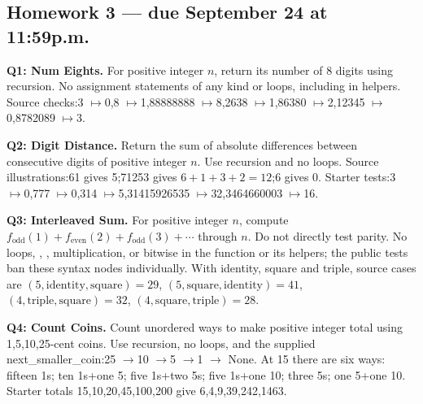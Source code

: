 \subsection{Homework 3 --- due September 24 at 11:59p.m.}
\begin{prob}
\textbf{Q1: Num Eights.} For positive integer $n$, return its number of 8 digits using recursion. No assignment statements of any kind or loops, including in helpers. Source checks:3 $\mapsto$0,8 $\mapsto$1,88888888 $\mapsto$8,2638 $\mapsto$1,86380 $\mapsto$2,12345 $\mapsto$0,8782089 $\mapsto$3.\par
{}
\end{prob}
\begin{prob}
\textbf{Q2: Digit Distance.} Return the sum of absolute differences between consecutive digits of positive integer $n$. Use recursion and no loops. Source illustrations:61 gives 5;71253 gives $6+1+3+2=12$;6 gives 0. Starter tests:3 $\mapsto$0,777 $\mapsto$0,314 $\mapsto$5,31415926535 $\mapsto$32,3464660003 $\mapsto$16.\par
{}
\end{prob}
\begin{prob}
\textbf{Q3: Interleaved Sum.} For positive integer $n$, compute $f_{\mathrm{odd}}(1)+f_{\mathrm{even}}(2)+f_{\mathrm{odd}}(3)+\cdots$ through $n$. Do not directly test parity. No loops, \py{\%}, \py{//}, multiplication, or bitwise \py{\& | \textasciicircum} in the function or its helpers; the public tests ban these syntax nodes individually. With identity, square and triple, source cases are $(5,\mathrm{identity},\mathrm{square})=29$, $(5,\mathrm{square},\mathrm{identity})=41$, $(4,\mathrm{triple},\mathrm{square})=32$, $(4,\mathrm{square},\mathrm{triple})=28$.\par
{}
\end{prob}
\begin{prob}
\textbf{Q4: Count Coins.} Count unordered ways to make positive integer total using 1,5,10,25-cent coins. Use recursion, no loops, and the supplied next\_smaller\_coin:25 $\to$10 $\to$5 $\to$1 $\to$ None. At 15 there are six ways: fifteen 1s; ten 1s+one 5; five 1s+two 5s; five 1s+one 10; three 5s; one 5+one 10. Starter totals 15,10,20,45,100,200 give 6,4,9,39,242,1463.\par
{}
\end{prob}
